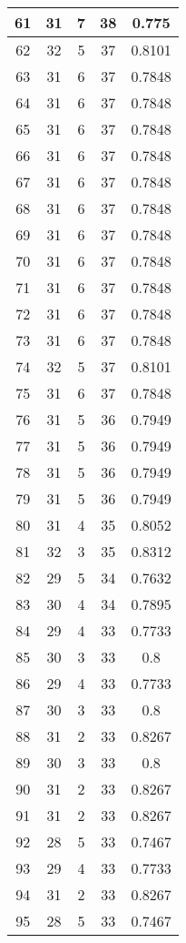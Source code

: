 \documentclass[letterpaper, 12pt]{article}
\begin{document}
\begin{longtable}{|c|c|c|c|c|}
61 & 31 & 7 & 38 & 0.775 \\
\hline
62 & 32 & 5 & 37 & 0.8101 \\
\hline
63 & 31 & 6 & 37 & 0.7848 \\
\hline
64 & 31 & 6 & 37 & 0.7848 \\
\hline
65 & 31 & 6 & 37 & 0.7848 \\
\hline
66 & 31 & 6 & 37 & 0.7848 \\
\hline
67 & 31 & 6 & 37 & 0.7848 \\
\hline
68 & 31 & 6 & 37 & 0.7848 \\
\hline
69 & 31 & 6 & 37 & 0.7848 \\
\hline
70 & 31 & 6 & 37 & 0.7848 \\
\hline
71 & 31 & 6 & 37 & 0.7848 \\
\hline
72 & 31 & 6 & 37 & 0.7848 \\
\hline
73 & 31 & 6 & 37 & 0.7848 \\
\hline
74 & 32 & 5 & 37 & 0.8101 \\
\hline
75 & 31 & 6 & 37 & 0.7848 \\
\hline
76 & 31 & 5 & 36 & 0.7949 \\
\hline
77 & 31 & 5 & 36 & 0.7949 \\
\hline
78 & 31 & 5 & 36 & 0.7949 \\
\hline
79 & 31 & 5 & 36 & 0.7949 \\
\hline
80 & 31 & 4 & 35 & 0.8052 \\
\hline
81 & 32 & 3 & 35 & 0.8312 \\
\hline
82 & 29 & 5 & 34 & 0.7632 \\
\hline
83 & 30 & 4 & 34 & 0.7895 \\
\hline
84 & 29 & 4 & 33 & 0.7733 \\
\hline
85 & 30 & 3 & 33 & 0.8 \\
\hline
86 & 29 & 4 & 33 & 0.7733 \\
\hline
87 & 30 & 3 & 33 & 0.8 \\
\hline
88 & 31 & 2 & 33 & 0.8267 \\
\hline
89 & 30 & 3 & 33 & 0.8 \\
\hline
90 & 31 & 2 & 33 & 0.8267 \\
\hline
91 & 31 & 2 & 33 & 0.8267 \\
\hline
92 & 28 & 5 & 33 & 0.7467 \\
\hline
93 & 29 & 4 & 33 & 0.7733 \\
\hline
94 & 31 & 2 & 33 & 0.8267 \\
\hline
95 & 28 & 5 & 33 & 0.7467 \\

\end{longtable}
\end{document}
